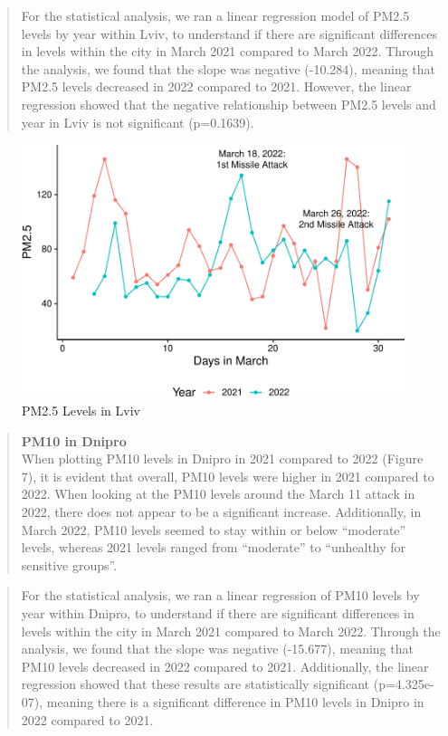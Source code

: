 \documentclass[
  12pt,
]{article}
\begin{document}
\begin{quote}
For the statistical analysis, we ran a linear regression model of PM2.5
levels by year within Lviv, to understand if there are significant
differences in levels within the city in March 2021 compared to March
2022. Through the analysis, we found that the slope was negative
(-10.284), meaning that PM2.5 levels decreased in 2022 compared to 2021.
However, the linear regression showed that the negative relationship
between PM2.5 levels and year in Lviv is not significant (p=0.1639).
\end{quote}

\begin{figure}
\centering
\includegraphics{Fontanie_Gordon_Weinberg_Project_files/figure-latex/visualizing PM25 in Lviv-1.pdf}
\caption{PM2.5 Levels in Lviv}
\end{figure}

\newpage

\begin{quote}
\textbf{PM10 in Dnipro}\\
When plotting PM10 levels in Dnipro in 2021 compared to 2022 (Figure 7),
it is evident that overall, PM10 levels were higher in 2021 compared to
2022. When looking at the PM10 levels around the March 11 attack in
2022, there does not appear to be a significant increase. Additionally,
in March 2022, PM10 levels seemed to stay within or below ``moderate''
levels, whereas 2021 levels ranged from ``moderate'' to ``unhealthy for
sensitive groups''.
\end{quote}

\begin{quote}
For the statistical analysis, we ran a linear regression of PM10 levels
by year within Dnipro, to understand if there are significant
differences in levels within the city in March 2021 compared to March
2022. Through the analysis, we found that the slope was negative
(-15.677), meaning that PM10 levels decreased in 2022 compared to 2021.
Additionally, the linear regression showed that these results are
statistically significant (p=4.325e-07), meaning there is a significant
difference in PM10 levels in Dnipro in 2022 compared to 2021.
\end{quote}
\end{document}
